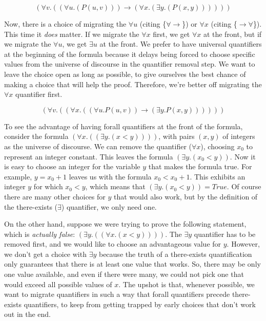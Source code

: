 {{$$(\forall v.((\forall u.(P(u, v))) \rightarrow (\forall x.(\exists y.(P(x, y))))))$$

Now, there is a choice of migrating the $\forall u$ (citing \{$\forall\rightarrow$\})
or $\forall x$ (citing \{$\rightarrow\forall$\}).
This time it \emph{does} matter.
If we migrate the $\forall x$ first, we get $\forall x$ at the front,
but if we migrate the $\forall u$, we get $\exists u$ at the front.
We prefer to have universal quantifiers at the beginning of the formula
because it delays being forced to choose specific values from the universe of discourse
in the quantifier removal step.
We want to leave the choice open as long as possible, to give ourselves
the best chance of making a choice that will help the proof.
Therefore, we're better off migrating the $\forall x$ quantifier first.

$$(\forall v.((\forall x.((\forall u.P(u, v)) \rightarrow (\exists y.P(x, y))))))$$

To see the advantage of having forall quantifiers at the front of the formula,
consider the formula $(\forall x.((\exists y.(x < y))))$,
with pairs $(x,y)$ of integers as the universe of discourse.
We can remove the quantifier ($\forall x$), choosing $x_0$ to
represent an integer constant.
This leaves the formula $(\exists y.(x_0 < y))$.
Now it is easy to choose an integer for the variable $y$
that makes the formula true. For example,  $y = x_0+1$
leaves us with the formula $x_0 < x_0 + 1$.
This exhibits an integer $y$ for which $x_0 < y$,
which means that $(\exists y.(x_0 < y)) = True$.
Of course there are many other choices for $y$ that would also work,
but by the definition of the there-exists ($\exists$) quantifier, we only need one.

On the other hand, suppose we were trying to prove the following statement, which
is \emph{actually false}:
$(\exists y.((\forall x.(x < y))))$.
The $\exists y$ quantifier has to be removed first,
and we would like to choose an advantageous value for $y$.
However, we don't get a choice with $\exists y$ because
the truth of a there-exists quantification only guarantees that
there is at least one value that works.
So, there may be only one value available, and even if there were many,
we could not pick one that would exceed all possible values of $x$.
The upshot is that, whenever possible, we want to migrate quantifiers
in such a way that forall quantifiers precede there-exists quantifiers,
to keep from getting trapped by early choices that don't work out in the end.

}}
